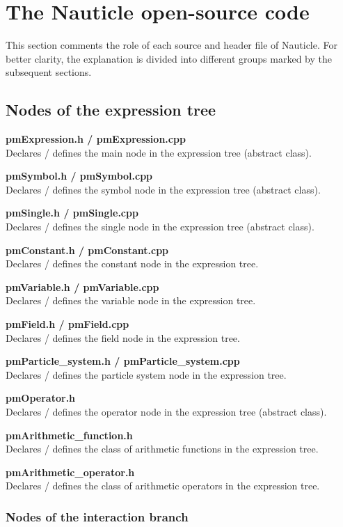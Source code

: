 \documentclass[a4paper,12pt,openany]{book}
\theoremstyle{break}
\begin{document}
\section{The Nauticle open-source code}
This section comments the role of each source and header file of Nauticle. For better clarity, the explanation is divided into different groups marked by the subsequent sections.
\subsection{Nodes of the expression tree}

\textbf{pmExpression.h / pmExpression.cpp} \\
Declares / defines the main node in the expression tree (abstract class).

\textbf{pmSymbol.h / pmSymbol.cpp} \\
Declares / defines the symbol node in the expression tree (abstract class).

\textbf{pmSingle.h / pmSingle.cpp} \\
Declares / defines the single node in the expression tree (abstract class).

\textbf{pmConstant.h / pmConstant.cpp} \\
Declares / defines the constant node in the expression tree.

\textbf{pmVariable.h / pmVariable.cpp} \\
Declares / defines the variable node in the expression tree.

\textbf{pmField.h / pmField.cpp} \\
Declares / defines the field node in the expression tree.

\textbf{pmParticle\_system.h / pmParticle\_system.cpp} \\
Declares / defines the particle system node in the expression tree.

\textbf{pmOperator.h} \\
Declares / defines the operator node in the expression tree (abstract class).

\textbf{pmArithmetic\_function.h} \\
Declares / defines the class of arithmetic functions in the expression tree.

\textbf{pmArithmetic\_operator.h} \\
Declares / defines the class of arithmetic operators in the expression tree.


\subsubsection{Nodes of the interaction branch}
\end{document}
